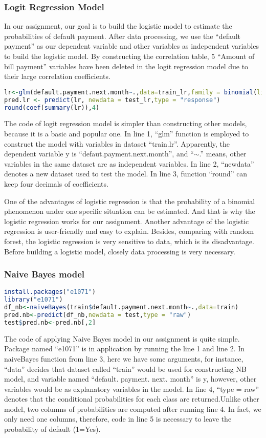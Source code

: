 \documentclass[a4paper,11pt]{article}
\begin{document}
\subsubsection{Logit Regression Model}
In our assignment, our goal is to build the logistic model to estimate the probabilities of default payment. After data processing, we use the ``default payment'' as our dependent variable and other variables as independent variables to build the logistic model. By constructing the correlation table, 5 ``Amount of bill payment'' variables have been deleted in the logit regression model due to their large correlation coefficients. 
\begin{lstlisting}[language=R]
lr<-glm(default.payment.next.month~.,data=train_lr,family = binomial(link="logit"))
pred.lr <- predict(lr, newdata = test_lr,type = "response")
round(coef(summary(lr)),4)
\end{lstlisting}
The code of logit regression model is simpler than constructing other models, because it is a basic and popular one. In line 1, ``glm'' function is employed to construct the model with variables in dataset ``train.lr''. Apparently, the dependent variable y is ``defaut.payment.next.month'', and ``$\sim$.'' means, other variables in the same dataset are as independent variables. In line 2, ``newdata'' denotes a new dataset used to test the model. In line 3, function ``round'' can keep four decimals of coefficients.

One of the advantages of logistic regression is that the probability of a binomial phenomenon under one specific situation can be estimated. And that is why the logistic regression works for our assignment. Another advantage of the logistic regression is user-friendly and easy to explain. Besides, comparing with random forest, the logistic regression is very sensitive to data, which is its disadvantage. Before building a logistic model, closely data processing is very necessary.
\subsubsection{Naive Bayes model}
\begin{lstlisting}[language=R]
install.packages("e1071")
library("e1071")
df_nb<-naiveBayes(train$default.payment.next.month~.,data=train)
pred.nb<-predict(df_nb,newdata = test,type = "raw")
test$pred.nb<-pred.nb[,2]
\end{lstlisting}
The code of applying Naive Bayes model in our assignment is quite simple. Package named ``e1071'' is in application by running the line 1 and line 2. In naiveBayes function from line 3, here we have some arguments, for instance, ``data'' decides that dataset called ``train'' would be used for constructing NB model, and variable named ``default. payment. next. month'' is y, however, other variables would be as explanatory variables in the model. In line 4, ``type = raw'' denotes that the conditional probabilities for each class are returned.Unlike other model, two columns of probabilities are computed after running line 4. In fact, we only need one columns, therefore, code in line 5 is necessary to leave the probability of default (1=Yes).
\end{document}
